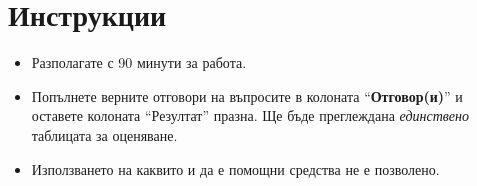 \section*{Инструкции}

\begin{itemize}
  \item Разполагате с 90 минути за работа.
  \item Попълнете верните отговори на въпросите в колоната "`\textbf{Отговор(и)}"'
    и оставете колоната "`Резултат"' празна. Ще бъде преглеждана \emph{единствено}
    таблицата за оценяване.
  \item Използването на каквито и да е помощни средства не е позволено.
\end{itemize}
